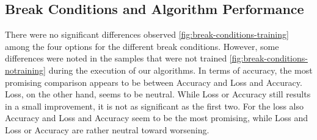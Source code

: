 \subsection{Break Conditions and Algorithm Performance}\label{subsec:break-conditions-and-algorithm-performance}
There were no significant differences observed \ref{fig:break-conditions-training} among the four options for the different break conditions.
However, some differences were noted in the samples that were not trained \ref{fig:break-conditions-notraining} during the execution of our algorithms.
In terms of accuracy, the most promising comparison appears to be between Accuracy and Loss and Accuracy.
Loss, on the other hand, seems to be neutral.
While Loss or Accuracy still results in a small improvement, it is not as significant as the first two.
For the loss also Accuracy and Loss and Accuracy seem to be the most promising, while Loss and Loss or Accuracy are rather neutral toward worsening.

